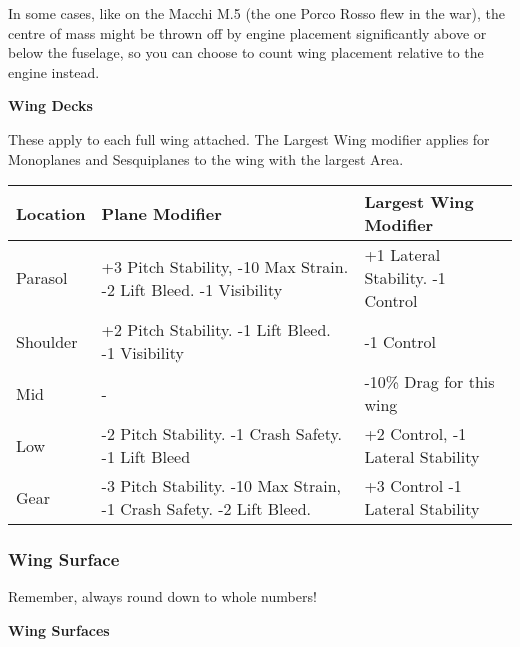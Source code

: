 \documentclass{article}
\begin{document}
In some cases, like on the Macchi M.5 (the one Porco Rosso flew in the
war), the centre of mass might be thrown off by engine placement
significantly above or below the fuselage, so you can choose to count
wing placement relative to the engine instead.

\textbf{Wing Decks}

These apply to each full wing attached. The Largest Wing modifier
applies for Monoplanes and Sesquiplanes to the wing with the largest
Area.

\begin{tabular}{|l|l|l|}
  \hline
  Location   & Plane Modifier                                               & Largest Wing Modifier    \\\hline
  Parasol    & +3 Pitch Stability, -10 Max Strain. -2 Lift Bleed. -1
  Visibility & +1 Lateral Stability. -1 Control                                                        \\\hline
  Shoulder   & +2 Pitch Stability. -1 Lift Bleed. -1 Visibility             & -1
  Control                                                                                              \\\hline
  Mid        & -                                                            & -10\% Drag for this wing \\\hline
  Low        & -2 Pitch Stability. -1 Crash Safety. -1 Lift Bleed           & +2 Control,
  -1 Lateral Stability                                                                                 \\\hline
  Gear       & -3 Pitch Stability. -10 Max Strain, -1 Crash Safety. -2 Lift
  Bleed.     & +3 Control -1 Lateral Stability                                                         \\\hline
\end{tabular}

\subsubsection{Wing Surface}
\label{_Wing Surface}

Remember, always round down to whole numbers!

\textbf{Wing Surfaces}
\end{document}
